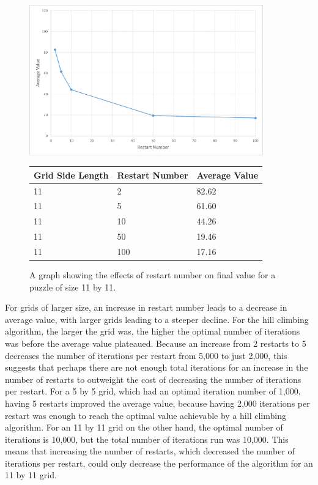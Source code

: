 \documentclass[12pt]{article}
\begin{document}
\begin{figure}[H]
    \centering
    \includegraphics[width=0.9\textwidth]{random_restarts_11x11_restarts_excel}
\begin{tabular}{ |p{4cm}||p{4cm}|p{4cm}|  }
 \hline
Grid Side Length& Restart Number &Average Value\\
 \hline
11&2&82.62\\
11&5&61.60\\
11&10&44.26\\
11&50&19.46\\
11&100&17.16\\
 \hline
\end{tabular}
    \caption{A graph showing the effects of restart number on final value for a puzzle of size 11 by 11.}
    \label{fig:random_restarts_11x11_restarts}
\end{figure}

For grids of larger size, an increase in restart number leads to a decrease in average value, with larger grids leading to a steeper decline. For the hill climbing algorithm, the larger the grid was, the higher the optimal number of iterations was before the average value plateaued. Because an increase from 2 restarts to 5 decreases the number of iterations per restart from 5,000 to just 2,000, this suggests that perhaps there are not enough total iterations for an increase in the number of restarts to outweight the cost of decreasing the number of iterations per restart. For a 5 by 5 grid, which had an optimal iteration number of 1,000, having 5 restarts improved the average value, because having 2,000 iterations per restart was enough to reach the optimal value achievable by a hill climbing algorithm. For an 11 by 11 grid on the other hand, the optimal number of iterations is 10,000, but the total number of iterations run was 10,000. This means that increasing the number of restarts, which decreased the number of iterations per restart, could only decrease the performance of the algorithm for an 11 by 11 grid.
\end{document}

